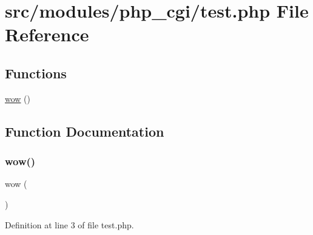\hypertarget{test_8php}{}\section{src/modules/php\+\_\+cgi/test.php File Reference}
\label{test_8php}
\subsection*{Functions}
\begin{DoxyCompactItemize}
\item 
\hyperlink{test_8php_addaa188915d7eb17af6423eb2c2273c1}{wow} ()
\end{DoxyCompactItemize}


\subsection{Function Documentation}
\mbox{\label{test_8php_addaa188915d7eb17af6423eb2c2273c1}} 
\subsubsection{\texorpdfstring{wow()}{wow()}}
{\footnotesize\ttfamily wow (\begin{DoxyParamCaption}{ }\end{DoxyParamCaption})}



Definition at line 3 of file test.\+php.

